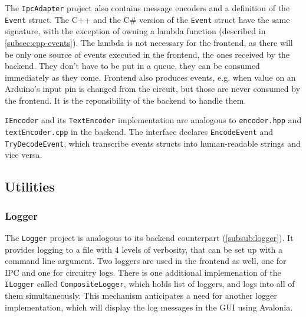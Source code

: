 The \texttt{IpcAdapter} project also contains message encoders and a definition of the \texttt{Event} struct. The C++ and the C\# version of the \texttt{Event} struct have the same signature, with the exception of owning a lambda function (described in \ref{subsec:cpp-events}). The lambda is not necessary for the frontend, as there will be only one source of events executed in the frontend, the ones received by the backend. They don't have to be put in a queue, they can be consumed immediately as they come. Frontend also produces events, e.g. when value on an Arduino's input pin is changed from the circuit, but those are never consumed by the frontend. It is the reponsibility of the backend to handle them.

\texttt{IEncoder} and its \texttt{TextEncoder} implementation are analogous to \texttt{encoder.hpp} and \texttt{textEncoder.cpp} in the backend. The interface declares \texttt{EncodeEvent} and \texttt{TryDecodeEvent}, which transcribe events structs into human-readable strings and vice versa.

\subsection{Utilities}

\subsubsection{Logger}

The \texttt{Logger} project is analogous to its backend counterpart (\ref{subsub:logger}). It provides logging to a file with 4 levels of verbosity, that can be set up with a command line argument. Two loggers are used in the frontend as well, one for IPC and one for circuitry logs. There is one additional implemenation of the \texttt{ILogger} called \texttt{CompositeLogger}, which holds list of loggers, and logs into all of them simultaneously. This mechanism anticipates a need for another logger implementation, which will display the log messages in the GUI using Avalonia.